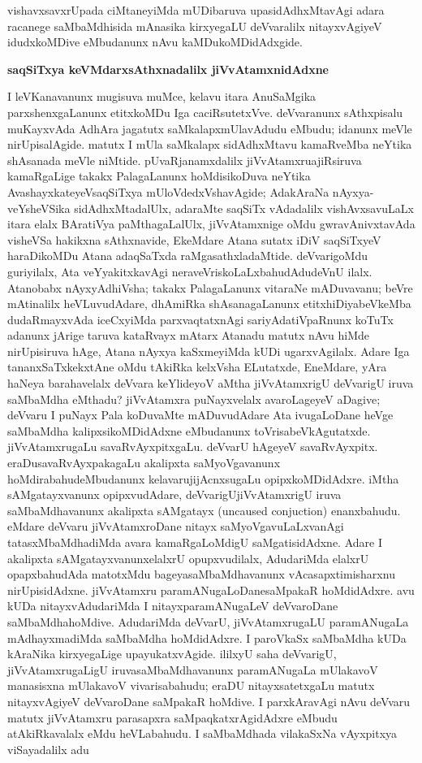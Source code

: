 vishavxsavxrUpada ciMtaneyiMda mUDibaruva upasidAdhxMtavAgi adara racanege saMbaMdhisida mAnasika kirxyegaLU deVvaralilx nitayxvAgiyeV idudxkoMDive eMbudanunx nAvu kaMDukoMDidAdxgide.

\bigskip
\begin{center}
{\Large\bf saqSiTxya keVMdarxsAthxnadalilx jiVvAtamxnidAdxne}
\end{center}

I leVKanavanunx mugisuva muMce, kelavu itara AnuSaMgika parxshenxgaLanunx etitx\-koMDu Iga caciRsutetxVve. deVvaranunx sAthxpisalu muKayxvAda AdhAra jagatutx saMkalapx\-mUlavAdudu eMbudu; idanunx meVle nirUpisalAgide. matutx I mUla saMkalapx sidAdhxMtavu kamaRveMba neYtika shAsanada meVle niMtide. pUvaRjanamxdalilx jiVvAtamxru\break ajiRsiruva kamaRgaLige takakx PalagaLanunx hoMdisikoDuva neYtika AvashayxkateyeV\break saqSiTxya mUloVdedxVshavAgide; AdakAraNa nAyxya-veYsheVSika sidAdhxMtadalUlx, ada\-raMte saqSiTx vAdadalilx vishAvxsavuLaLx itara elalx BAratiVya paMthagaLalUlx, jiVvAtamxnige oMdu gwravAnivxtavAda visheVSa hakikxna sAthxnavide, EkeMdare Atana sutatx iDiV saqSiTxyeV haraDikoMDu Atana adaqSaTxda raMgasathxladaMtide. deVvarigoMdu guriyilalx, Ata veYya\-kitxkavAgi neraveVriskoLaLxbahudAdudeVnU ilalx. Atanobabx nAyxyAdhiVsha; takakx Pala\-gaLanunx vitaraNe mADuvavanu; beVre mAtinalilx heVLuvudAdare, dhAmiRka shAsana\-gaLanunx etitxhiDiyabeVkeMba dudaRmayxvAda iceCxyiMda parxvaqtatxnAgi sariyAda\break \hbox{tiVpaRnunx} koTuTx adanunx jArige taruva kataRvayx mAtarx Atanadu matutx nAvu hiMde nirUpisiruva hAge, Atana nAyxya kaSxmeyiMda kUDi ugarxvAgilalx. Adare Iga tananxSaTxkekxtAne oMdu tAkiRka kelxVsha ELutatxde, EneMdare, yAra haNeya barahavelalx deVvara keYlideyoV aMtha jiVvAtamxrigU deVvarigU iruva saMbaMdha eMthadu? jiVvAtamxra puNayxvelalx avaroLageyeV aDagive; deVvaru I puNayx Pala koDuvaMte mADuvu\-dAdare Ata ivugaLoDane heVge saMbaMdha kalipxsikoMDidAdxne eMbudanunx toVrisa\-beVkAgutatxde. jiVvAtamxrugaLu savaRvAyxpitxgaLu. deVvarU hAgeyeV savaRvAyxpitx. eraDu\break savaRvAyxpakagaLu akalipxta saMyoVgavanunx hoMdirabahudeMbudanunx kelavaru\break jijAcnxsugaLu opipxkoMDidAdxre. iMtha sAMgatayxvanunx opipxvudAdare, deVvarigU\break jiVvAtamxrigU iruva saMbaMdhavanunx akalipxta sAMgatayx {\rm(uncaused conjuction)} enanxbahudu. eMdare deVvaru jiVvAtamxroDane nitayx saMyoVgavuLaLxvanAgi tatasxM\-baMdha\-diMda avara kamaRgaLoMdigU saMgatisidAdxne. Adare I akalipxta sAMgatayxvanunx\break elalxrU opupxvudilalx, AdudariMda elalxrU opapxbahudAda matotxMdu bageya\break saMbaMdha\-vanunx vAcasapxtimisharxnu nirUpisidAdxne. jiVvAtamxru paramANugaLoDane\break saMpakaR hoMdidAdxre. avu kUDa nitayxvAdudariMda I nitayxparamANugaLeV deVva\-roDane saMbaMdhahoMdive. AdudariMda deVvarU, jiVvAtamxrugaLU paramANu\-gaLa mAdhayxmadiMda saMbaMdha hoMdidAdxre. I paroVkaSx saMbaMdha kUDa kAraNika kirxye\-gaLige upayukatxvAgide. ililxyU saha deVvarigU, jiVvAtamxrugaLigU iruva\break saMbaMdhavanunx paramANugaLa mUlakavoV manasisxna mUlakavoV vivarisabahudu; eraDU nitayxsatetxgaLu matutx nitayxvAgiyeV deVvaroDane saMpakaR hoMdive. I parxkAra\-vAgi nAvu deVvaru matutx jiVvAtamxru parasapxra saMpaqkatxrAgidAdxre eMbudu atAkiRka\-valalx eMdu heVLabahudu. I saMbaMdhada vilakaSxNa vAyxpitxya viSayadalilx adu 